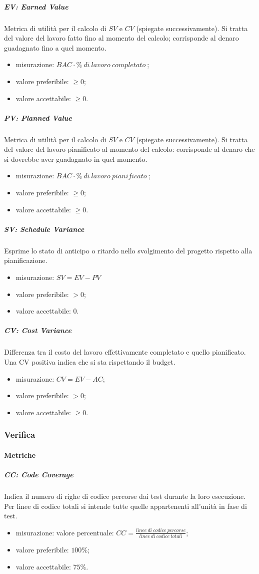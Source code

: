 			\subparagraph{EV: Earned Value}
			Metrica di utilità per il calcolo di $SV$ e $CV$ (spiegate successivamente). Si tratta del valore del lavoro fatto fino al momento del calcolo; corrisponde al denaro guadagnato fino a quel momento.
			\begin{itemize}
				\item  misurazione: $BAC \cdot \%\ di\ lavoro\ completato\ $;
				\item  valore preferibile: $ \geq 0$;
				\item  valore accettabile: $ \geq 0$.
			\end{itemize}
			\subparagraph{PV: Planned Value}
			Metrica di utilità per il calcolo di $SV$ e $CV$ (spiegate successivamente). Si tratta del valore del lavoro pianificato al momento del calcolo: corrisponde al denaro che si dovrebbe aver guadagnato in quel momento.
			\begin{itemize}
				\item  misurazione: $BAC \cdot \%\ di\ lavoro\ pianificato\ $;
				\item  valore preferibile: $ \geq 0$;
				\item  valore accettabile: $ \geq 0$.
			\end{itemize}			
			\subparagraph{SV: Schedule Variance}
			Esprime lo stato di anticipo o ritardo nello svolgimento del progetto rispetto alla pianificazione.
			\begin{itemize}
				\item misurazione: $SV = EV - PV$
				\item valore preferibile: $ > 0$;
				\item valore accettabile: 0.
			\end{itemize}
			\subparagraph{CV: Cost Variance}
			Differenza tra il costo del lavoro effettivamente completato e quello pianificato. Una CV positiva indica che si sta rispettando il budget.
			\begin{itemize}
				\item misurazione: $CV = EV - AC$;
				\item valore preferibile: $ > 0$;
				\item valore accettabile: $ \geq 0$.
			\end{itemize}

	\subsubsection{Verifica}
		\paragraph{Metriche}
			\subparagraph{CC: Code Coverage}
				Indica il numero di righe di codice percorse dai test durante la loro esecuzione. Per linee di codice totali si intende tutte quelle appartenenti all'unità in fase di test.
				\begin{itemize}
					\item misurazione: valore percentuale: $CC = \frac{linee\ di\ codice\ percorse}{linee\ di\ codice\ totali}$;
					\item valore preferibile: $100\%$;
					\item valore accettabile: $75\%$.
				\end{itemize}
